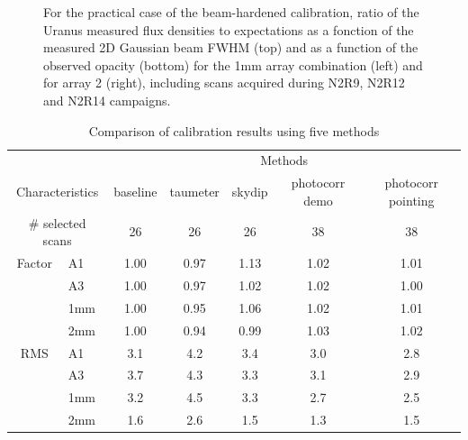 \begin{figure}[ht!]
\begin{center}
\caption[Uranus flux density stability using the
  practical case of the beam-hardened calibration]{For the
  practical case of the beam-hardened calibration, 
  ratio of the Uranus measured flux densities to expectations as a
  fonction of the measured 2D Gaussian beam FWHM (top) and as a
  function of the observed opacity (bottom) for the 1mm array
  combination (left) and for array 2 (right),
  including scans acquired during N2R9, N2R12 and N2R14 campaigns. }
\label{fig:calib_uranus_vs_atmtrans_all}
\end{center}
\end{figure}



\begin{table}[th]
\begin{center}
\begin{tabular}{|c|l|c|c|c|c|c|}
  \hline
  \multicolumn{2}{|c|}{}  &  \multicolumn{5}{|c|}{Methods} \\\cline{3-7}
  \multicolumn{2}{|c|}{Characteristics} &  baseline  & taumeter  &  skydip  &  photocorr demo & photocorr pointing \\
  \hline\hline
   \multicolumn{2}{|c|}{$\#$ selected scans} & 26    &       26  &    26    &    38           &    38 \\ 
  \hline 
  Factor &  A1          &   1.00  &  0.97   &  1.13    &   1.02    &   1.01  \\
       &  A3            &   1.00  &  0.97   &  1.02    &   1.02    &   1.00  \\
       &  1mm           &   1.00  &  0.95   &  1.06    &   1.02    &   1.01  \\
       &  2mm           &   1.00  &  0.94   &  0.99    &   1.03    &   1.02  \\
  \hline
  RMS  &  A1            &  3.1    &   4.2   &   3.4    &    3.0    &   2.8 \\
       &  A3            &  3.7    &   4.3   &   3.3    &    3.1    &   2.9 \\
       &  1mm           &  3.2    &   4.5   &   3.3    &    2.7    &   2.5 \\
       &  2mm           &  1.6    &   2.6   &   1.5    &    1.3    &   1.5 \\
\hline\hline
\end{tabular}
\caption[Comparison of calibration results using five methods]{Comparison of calibration results using five methods}
\label{tab:Abs_calibration_results_all}
\end{center}
\end{table}






